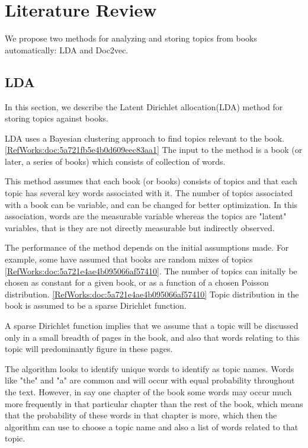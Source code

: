
\section{Literature Review} \label{section:algorithms}
We propose two methods for analyzing and storing topics from books automatically: LDA and Doc2vec. 

\subsection{LDA}
\par In this section, we describe the Latent Dirichlet allocation(LDA) method for storing topics against books. 
\par LDA uses a Bayesian clustering approach to find topics relevant to the book. \ref{RefWorks:doc:5a721fb5e4b0d609eec83aa1} The input to the method is a book (or later, a series of books) which consists of collection of words. 
\par This method assumes that each book (or books) consists of topics and that each topic has several key words associated with it. The number of topics associated with a book can be variable, and can be changed for better optimization. In this association, words are the measurable variable whereas the topics are "latent" variables, that is they are not directly measurable but indirectly observed. 
\par The performance of the method depends on the initial assumptions made. For example, some have assumed that books are random mixes of topics \ref{RefWorks:doc:5a721e4ae4b095066af57410}. The number of topics can initally be chosen as constant for a given book, or as a function of a chosen Poisson distribution. \ref{RefWorks:doc:5a721e4ae4b095066af57410} Topic distribution in the book is assumed to be a sparse Dirichlet function.
\par A sparse Dirichlet function implies that we assume that a topic will be discussed only in a small breadth of pages in the book, and also that words relating to this topic will predominantly figure in these pages.
\par The algorithm looks to identify unique words to identify as topic names. Words like "the" and "a" are common and will occur with equal probability throughout the text. However, in say one chapter of the book some words may occur much more frequently in that particular chapter than the rest of the book, which means that the probability of these words in that chapter is more, which then the algorithm can use to choose a topic name and also a list of words related to that topic.

